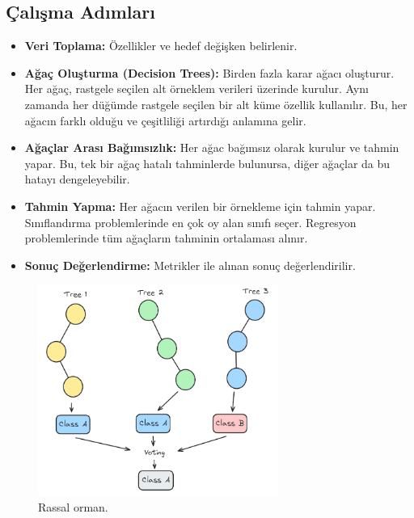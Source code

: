 \subsection{Çalışma Adımları}
\begin{itemize}
    \item \textbf{Veri Toplama:} Özellikler ve hedef değişken belirlenir.
    \item \textbf{Ağaç Oluşturma (Decision Trees):} Birden fazla karar ağacı oluşturur. Her ağaç, rastgele seçilen alt örneklem verileri üzerinde kurulur. Aynı zamanda her düğümde rastgele seçilen bir alt küme özellik kullanılır. Bu, her ağacın farklı olduğu ve çeşitliliği artırdığı anlamına gelir.
    \item \textbf{Ağaçlar Arası Bağımsızlık:} Her ağac bağımsız olarak kurulur ve tahmin yapar. Bu, tek bir ağaç hatalı tahminlerde bulunursa, diğer ağaçlar da bu hatayı dengeleyebilir.
    \item \textbf{Tahmin Yapma:} Her ağacın verilen bir örnekleme için tahmin yapar. Sınıflandırma problemlerinde en çok oy alan sınıfı seçer. Regresyon problemlerinde tüm ağaçların tahminin ortalaması alınır.
    \item \textbf{Sonuç Değerlendirme:} Metrikler ile alınan sonuç değerlendirilir.
\end{itemize}

\begin{figure}[h]
    \centering
    \includegraphics[width=0.7\textwidth]{images/random_forest.png}
    \caption{Rassal orman.}
    \label{fig:enter-label}
\end{figure}

